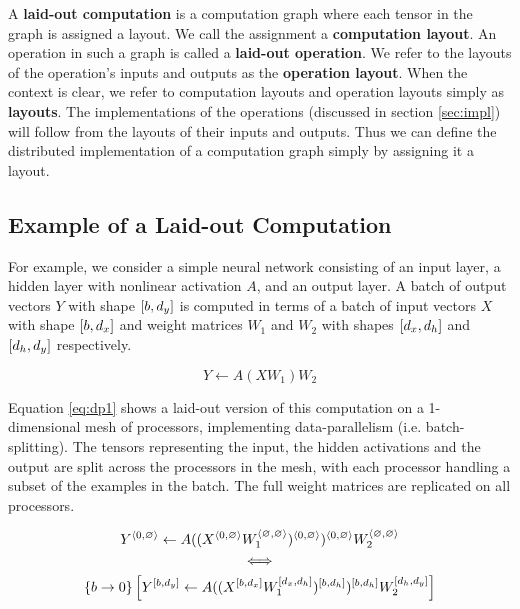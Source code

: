 \documentclass{article}
\begin{document}
\begin{itemize}
\def \THREED {\{ \scalebox{0.8}{$\begin{array} {l} b \rightarrow 0, d_h \rightarrow 1, \\ d_x \rightarrow 2, d_y \rightarrow 2\end{array}$} \}}

A \textbf{laid-out computation} is a computation graph where each tensor in the graph is assigned a layout.  We call the assignment a \textbf{computation layout}.  An operation in such a graph is called a \textbf{laid-out operation}.  We refer to the layouts of the operation's inputs and outputs as the \textbf{operation layout}.  When the context is clear, we refer to computation layouts and operation layouts simply as \textbf{layouts}.  The implementations of the operations (discussed in section \ref{sec:impl}) will follow from the layouts of their inputs and outputs.  Thus we can define the distributed implementation of a computation graph simply by assigning it a layout.




\subsection{Example of a Laid-out Computation}

For example, we consider a simple neural network consisting of an input layer, a hidden layer with nonlinear activation $A$, and an output layer.  A batch of output vectors $Y$ with shape ${{[b, d_y]}}$  is computed in terms of a batch of input vectors $X$ with shape ${{[b, d_x]}}$ and weight matrices $W_1$ and $W_2$ with shapes ${{[d_x, d_h]}}$ and ${{[d_h, d_y]}}$ respectively.

\begin{equation} Y \gets A(XW_1)W_2 \label{eq:ff} \end{equation}




Equation \ref{eq:dp1} shows a laid-out version of this computation on a 1-dimensional mesh of processors, implementing data-parallelism (i.e. batch-splitting).  The tensors representing the input, the hidden activations and the output are split across the processors in the mesh, with each processor handling a subset of the examples in the batch. The full weight matrices are replicated on all processors.

\begin{subequations}
\begin{gather}
Y^{\langle 0, \varnothing \rangle} \gets A((X^{\langle 0, \varnothing \rangle} W_1^{\langle \varnothing, \varnothing \rangle})^{\langle 0, \varnothing \rangle})^{\langle 0, \varnothing \rangle} W_2^{\langle \varnothing, \varnothing \rangle} \label{eq:dp1} \\
\Longleftrightarrow \nonumber \\
{{\{b \rightarrow 0\}}} \left[Y^{{[b, d_y]}} \gets A((X^{{[b, d_x]}} W_1^{{[d_x, d_h]}})^{{[b, d_h]}})^{{[b, d_h]}} W_2^{{[d_h, d_y]}} \right] \label{eq:dp3}
\end{gather}
\end{subequations}




\end{itemize}
\end{document}
